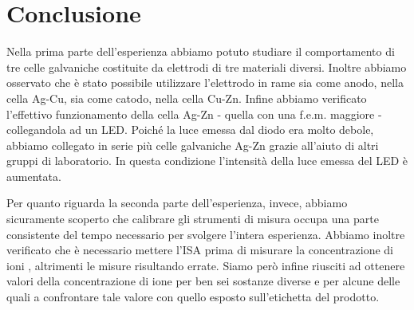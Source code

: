 \section*{Conclusione}

Nella prima parte dell'esperienza abbiamo potuto studiare il comportamento di tre celle galvaniche costituite da elettrodi di tre materiali diversi.
Inoltre abbiamo osservato che è stato possibile utilizzare l'elettrodo in rame sia come anodo, nella cella Ag-Cu, sia come catodo, nella cella Cu-Zn.
Infine abbiamo verificato l'effettivo funzionamento della cella Ag-Zn - quella con una f.e.m. maggiore - collegandola ad un LED.
Poiché la luce emessa dal diodo era molto debole, abbiamo collegato in serie più celle galvaniche Ag-Zn grazie all'aiuto di altri gruppi di laboratorio.
In questa condizione l'intensità della luce emessa del LED è aumentata.

Per quanto riguarda la seconda parte dell'esperienza, invece, abbiamo sicuramente scoperto che calibrare gli strumenti di misura occupa una parte consistente del tempo necessario per svolgere l'intera esperienza.
Abbiamo inoltre verificato che è necessario mettere l'ISA prima di misurare la concentrazione di ioni , altrimenti le misure risultando errate.
Siamo però infine riusciti ad ottenere valori della concentrazione di ione  per ben sei sostanze diverse e per alcune delle quali a confrontare tale valore con quello esposto sull'etichetta del prodotto.